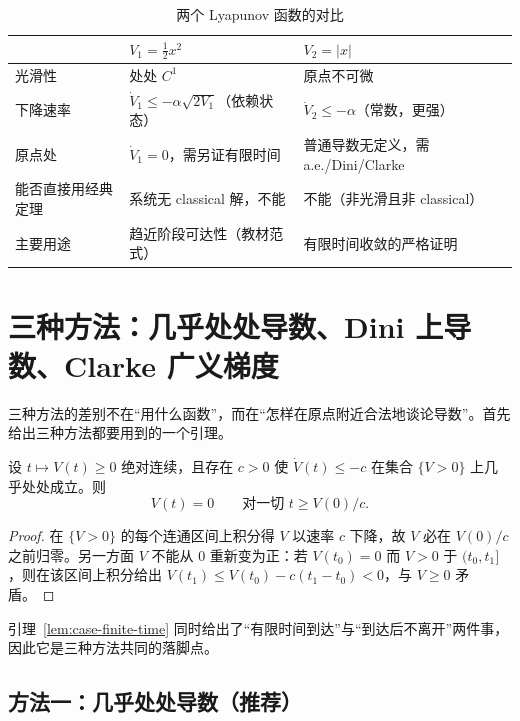\begin{table}[!htb]
  \centering
  \small
  \begin{tabular}{@{}p{2.6cm}|p{4.6cm}|p{4.6cm}@{}}
    \hline
     & $V_1=\tfrac12x^2$ & $V_2=|x|$ \\
    \hline
    光滑性 & 处处 $C^1$ & 原点不可微 \\
    \hline
    下降速率 & $\dot V_1\le-\alpha\sqrt{2V_1}$（依赖状态） & $\dot V_2\le-\alpha$（常数，更强） \\
    \hline
    原点处 & $\dot V_1=0$，需另证有限时间 & 普通导数无定义，需 a.e./Dini/Clarke \\
    \hline
    能否直接用经典定理 & 系统无 classical 解，不能 & 不能（非光滑且非 classical） \\
    \hline
    主要用途 & 趋近阶段可达性（教材范式） & 有限时间收敛的严格证明 \\
    \hline
  \end{tabular}
  \caption{两个 Lyapunov 函数的对比}
  \label{tab:case-lyapunov}
\end{table}

\section{三种方法：几乎处处导数、Dini 上导数、Clarke 广义梯度}\label{sec:case-methods}

三种方法的差别不在“用什么函数”，而在“怎样在原点附近合法地谈论导数”。首先给出三种方法都要用到的一个引理。

\begin{lemma}[非负绝对连续函数的有限时间归零]\label{lem:case-finite-time}
  设 $t\mapsto V(t)\ge0$ 绝对连续，且存在 $c>0$ 使 $\dot V(t)\le-c$ 在集合 $\{V>0\}$ 上几乎处处成立。则
  \[
  V(t)=0\qquad\text{对一切 } t\ge V(0)/c .
  \]
\end{lemma}

\begin{proof}
  在 $\{V>0\}$ 的每个连通区间上积分得 $V$ 以速率 $c$ 下降，故 $V$ 必在 $V(0)/c$ 之前归零。另一方面 $V$ 不能从 $0$ 重新变为正：若 $V(t_0)=0$ 而 $V>0$ 于 $(t_0,t_1]$，则在该区间上积分给出 $V(t_1)\le V(t_0)-c(t_1-t_0)<0$，与 $V\ge0$ 矛盾。
\end{proof}

引理~\ref{lem:case-finite-time} 同时给出了“有限时间到达”与“到达后不离开”两件事，因此它是三种方法共同的落脚点。

\subsection{方法一：几乎处处导数（推荐）}

